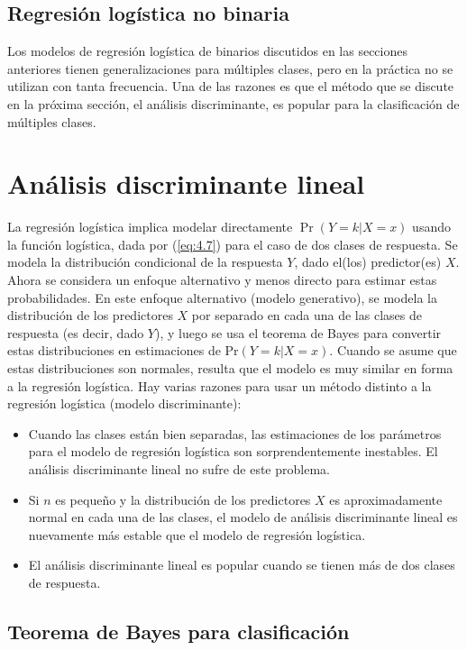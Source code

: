 \subsection{Regresión logística no binaria}

Los modelos de regresión logística de binarios discutidos en las secciones anteriores tienen generalizaciones para múltiples clases, pero en la práctica no se utilizan con tanta frecuencia. Una de las razones es que el método que se discute en la próxima sección, el análisis discriminante, es popular para la clasificación de múltiples clases. 

\section{Análisis discriminante lineal}

La regresión logística implica modelar directamente $\Pr(Y = k | X = x)$ usando la función logística, dada por (\ref{eq:4.7}) para el caso de dos clases de respuesta. Se modela la distribución condicional de la respuesta $Y$, dado el(los) predictor(es) $X$. Ahora se considera un enfoque alternativo y menos directo para estimar estas probabilidades. En este enfoque alternativo (modelo generativo), se modela la distribución de los predictores $X$ por separado en cada una de las clases de respuesta (es decir, dado $Y$), y luego se usa el teorema de Bayes para convertir estas distribuciones en estimaciones de $\text{Pr}(Y = k | X = x)$. Cuando se asume que estas distribuciones son normales, resulta que el modelo es muy similar en forma a la regresión logística. Hay varias razones para usar un método distinto a la regresión logística (modelo discriminante):
\begin{itemize}
\item Cuando las clases están bien separadas, las estimaciones de los parámetros para el modelo de regresión logística son sorprendentemente inestables. El análisis discriminante lineal no sufre de este problema.
\item Si $n$ es pequeño y la distribución de los predictores $X$ es aproximadamente normal en cada una de las clases, el modelo de análisis discriminante lineal es nuevamente más estable que el modelo de regresión logística.
\item El análisis discriminante lineal es popular cuando se tienen más de dos clases de respuesta.
\end{itemize}

\subsection{Teorema de Bayes para clasificación}

